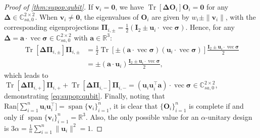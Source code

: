 \documentclass[noinfoline]{imsart}\setcounter{tocdepth}{2}
\renewcommand{\b}[1]{\mathbb{#1}} %
\newcommand{\m}[1]{\mathbf{#1}} %
\newcommand{\mb}[1]{\boldsymbol{#1}} %
\newcommand{\tr}[1]{\operatorname{Tr}\left[#1\right]}
\renewcommand{\vec}{\operatorname{vec}}
\DeclareMathOperator*{\spann}{span}
\theoremstyle{plain}
\begin{document}
\begin{appendix}
\begin{proof}[Proof of \cref{thm:supop:qubit}]
If $\m{v}_{i} = \m{0}$, we have $\tr{\mb{\Delta} \m{O}_{i}} \m{O}_{i} = \m{0}$ for any $\mb{\Delta} \in \b{C}_{sa, 0}^{2 \times 2}$.
When $\m{v}_{i} \ne \m{0}$, the eigenvalues of $\m{O}_{i}$ are given by $w_{i} \pm \|\m{v}_{i}\|$, with the corresponding eigenprojections $\m{\Pi}_{i,\pm} = \tfrac{1}{2} (\m{I}_{2} \pm \m{u}_{i} \cdot \vec{\mb{\sigma}})$.
Hence, for any $\mb{\Delta} = \m{a} \cdot \vec{\mb{\sigma}} \in \b{C}_{sa, 0}^{2 \times 2}$ with $\m{a} \in \b{R}^{3}$:
\begin{align*}
    \tr{\mb{\Delta} \m{\Pi}_{i, \pm}} \m{\Pi}_{i, \pm} &= \frac{1}{2} \tr{\pm (\m{a} \cdot \vec{\mb{\sigma}}) (\m{u}_{i} \cdot \vec{\mb{\sigma}})} \frac{\m{I}_{2} \pm \m{u}_{i} \cdot \vec{\mb{\sigma}}}{2} \\
    &= \pm (\m{a} \cdot \m{u}_{i}) \frac{\m{I}_{2} \pm \m{u}_{i} \cdot \vec{\mb{\sigma}}}{2},
\end{align*}
which leads to $\tr{\mb{\Delta} \m{\Pi}_{i, +}} \m{\Pi}_{i, +} + \tr{\mb{\Delta} \m{\Pi}_{i, -}} \m{\Pi}_{i, -} = (\m{u}_{i} \m{u}_{i}^{\top} \m{a}) \cdot \vec{\mb{\sigma}} \in \b{C}_{sa, 0}^{2 \times 2}$,
demonstrating \eqref{eq:supop:qubit}. Finally, noting that $\text{Ran} \big[ \sum_{i=1}^{n} \m{u}_{i} \m{u}_{i}^{\top} \big] = \spann \{\m{v}_{i}\}_{i=1}^{n}$, it is clear that $\{\m{O}_{i}\}_{i=1}^{n}$ is complete if and only if $\spann \{\m{v}_{i}\}_{i=1}^{n} = \b{R}^{3}$. Also, the only possible value for an $\alpha$-unitary design is $3\alpha = \tfrac{1}{n} \sum_{i=1}^{n} \|\m{u}_{i}\|^{2} = 1$.
\end{proof}



\end{appendix}
\end{document}
